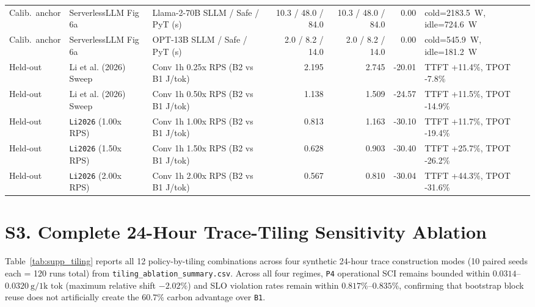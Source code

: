 \documentclass[11pt,a4paper]{article}
\begin{document}
\begin{table}[ht]
{\begin{tabular}{@{}lllrrrl@{}}
\midrule
Calib.\ anchor & ServerlessLLM Fig 6a & Llama-2-70B SLLM / Safe / PyT (s) & 10.3 / 48.0 / 84.0 & 10.3 / 48.0 / 84.0 & 0.00 & cold=2183.5~W, idle=724.6~W \\
Calib.\ anchor & ServerlessLLM Fig 6a & OPT-13B SLLM / Safe / PyT (s) & 2.0 / 8.2 / 14.0 & 2.0 / 8.2 / 14.0 & 0.00 & cold=545.9~W, idle=181.2~W \\
\midrule
Held-out & Li et al. (2026) Sweep & Conv 1h 0.25x RPS (B2 vs B1 J/tok) & 2.195 & 2.745 & -20.01 & TTFT +11.4\%, TPOT -7.8\% \\
Held-out & Li et al. (2026) Sweep & Conv 1h 0.50x RPS (B2 vs B1 J/tok) & 1.138 & 1.509 & -24.57 & TTFT +11.5\%, TPOT -14.9\% \\
Held-out & \texttt{Li2026} (1.00x RPS) & Conv 1h 1.00x RPS (B2 vs B1 J/tok) & 0.813 & 1.163 & -30.10 & TTFT +11.7\%, TPOT -19.4\% \\
Held-out & \texttt{Li2026} (1.50x RPS) & Conv 1h 1.50x RPS (B2 vs B1 J/tok) & 0.628 & 0.903 & -30.40 & TTFT +25.7\%, TPOT -26.2\% \\
Held-out & \texttt{Li2026} (2.00x RPS) & Conv 1h 2.00x RPS (B2 vs B1 J/tok) & 0.567 & 0.810 & -30.04 & TTFT +44.3\%, TPOT -31.6\% \\
\bottomrule
\end{tabular}%
}
\end{table}

\section*{S3. Complete 24-Hour Trace-Tiling Sensitivity Ablation}
Table~\ref{tab:supp_tiling} reports all 12 policy-by-tiling combinations across four synthetic 24-hour trace construction modes (10 paired seeds each = 120 runs total) from \texttt{tiling\_ablation\_summary.csv}. Across all four regimes, \texttt{P4} operational SCI remains bounded within $0.0314$--$0.0320~\text{g}/\text{1k~tok}$ (maximum relative shift $-2.02\%$) and SLO violation rates remain within $0.817\%$--$0.835\%$, confirming that bootstrap block reuse does not artificially create the $60.7\%$ carbon advantage over \texttt{B1}.
\end{document}
